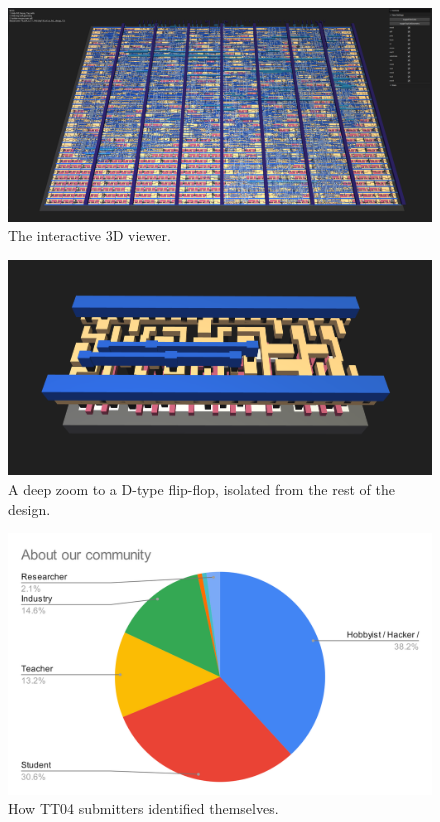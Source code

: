 \begin{figure}[htp]
\centering
\includegraphics[width=\columnwidth]{./Figs/gh action gds 3d view.png}
\caption{The interactive 3D viewer.}
\label{fig:interactive_3D_viewer}
\end{figure}

\begin{figure}[htp]
\centering
\includegraphics[width=\columnwidth]{./Figs/gh action d type flop 3d closeup.png}
\caption{A deep zoom to a D-type flip-flop, isolated from the rest of the design.}
\label{fig:zoom_d_flip_flop}
\end{figure}

\begin{figure}[htp]
\centering
\includegraphics[width=\columnwidth]{./Figs/about our community pie chart.png}
\caption{How TT04 submitters identified themselves.}
\label{fig:TT02_submitters}
\end{figure}

